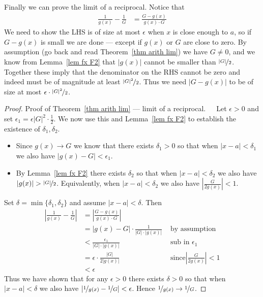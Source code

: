 Finally we can prove the limit of a reciprocal. Notice that
\begin{align*}
  \frac{1}{g(x)} - \frac{1}{G} &= \frac{G-g(x)}{g(x) \cdot G}
\end{align*}
We need to show the LHS is of size at most $\epsilon$ when $x$ is close enough to $a$,
 so if $G-g(x)$ is small we are done --- except if $g(x)$ or $G$ are close to zero. By assumption
(go back and read Theorem~\ref{thm arith lim}) we have $G \neq 0$, and we know from
Lemma~\ref{lem fx F2} that $|g(x)|$ cannot be smaller than $\nicefrac{|G|}{2}$.
Together these imply that the denominator on the RHS cannot be zero and indeed must be
of magnitude at least $\nicefrac{|G|^2}{2}$. Thus we need $|G-g(x)|$ to be of size at most
$\epsilon \cdot \nicefrac{|G|^2}{2}$.
\begin{proof}{Proof of Theorem~\ref{thm arith lim} --- limit of a reciprocal.}\ \ \
 Let $\epsilon>0$ and set $\epsilon_1 = \epsilon|G|^2 \cdot \frac{1}{2}$. We
now use this and Lemma~\ref{lem fx F2} to establish the existence of $\delta_1,
\delta_2$.
\begin{itemize}
 \item Since $g(x) \to G$ we know that there exists $\delta_1>0$ so that when
$|x-a|<\delta_1$ we also have $|g(x)-G|<\epsilon_1$.
 \item By Lemma~\ref{lem fx F2} there exists $\delta_2$ so that when
$|x-a|<\delta_2$ we also have $|g(x)|>\nicefrac{|G|}{2}$. Equivalently,
when $|x-a|<\delta_2$ we also have $\left|\frac{G}{2g(x)}\right|<1$.
\end{itemize}


Set $\delta = \min\{\delta_1,\delta_2\}$ and assume $|x-a|<\delta$. Then
\begin{align*}
  \left| \frac{1}{g(x)} - \frac{1}{G} \right|
  &= \left| \frac{G - g(x)}{g(x) \cdot G} \right| \\
  &= |g(x) - G| \cdot \frac{1}{|G|\cdot |g(x)|} & \text{ by assumption}
\\
  & < \frac{\epsilon_1}{|G| \cdot |g(x)|} & \text{ sub in $\epsilon_1$} \\
  & = \epsilon \cdot \frac{|G|}{2  |g(x)|} & \text{ since
$\left|\frac{G}{2g(x)}\right|<1$}\\
  & < \epsilon
\end{align*}
Thus we have shown that for any $\epsilon>0$ there exists $\delta>0$ so that
when $|x-a|<\delta$ we also have $|\nicefrac{1}{g(x)} -
\nicefrac{1}{G}|<\epsilon$. Hence $\nicefrac{1}{g(x)} \to \nicefrac{1}{G}$.
\end{proof}


